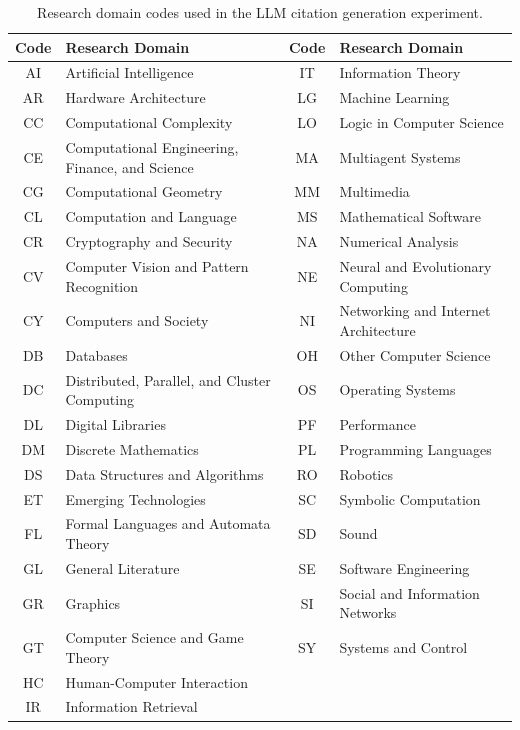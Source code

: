 \begin{table}[t]
  \centering
  \begin{threeparttable}
    \caption{Research domain codes used in the LLM citation generation experiment.}
    \label{tab:domain_codes}
    \small
{}
\begin{tabular}{cl|cl}
\toprule
\textbf{Code} & \textbf{Research Domain} & \textbf{Code} & \textbf{Research Domain} \\
\midrule
AI & Artificial Intelligence & IT & Information Theory \\
AR & Hardware Architecture & LG & Machine Learning \\
CC & Computational Complexity & LO & Logic in Computer Science \\
CE & Computational Engineering, Finance, and Science & MA & Multiagent Systems \\
CG & Computational Geometry & MM & Multimedia \\
CL & Computation and Language & MS & Mathematical Software \\
CR & Cryptography and Security & NA & Numerical Analysis \\
CV & Computer Vision and Pattern Recognition & NE & Neural and Evolutionary Computing \\
CY & Computers and Society & NI & Networking and Internet Architecture \\
DB & Databases & OH & Other Computer Science \\
DC & Distributed, Parallel, and Cluster Computing & OS & Operating Systems \\
DL & Digital Libraries & PF & Performance \\
DM & Discrete Mathematics & PL & Programming Languages \\
DS & Data Structures and Algorithms & RO & Robotics \\
ET & Emerging Technologies & SC & Symbolic Computation \\
FL & Formal Languages and Automata Theory & SD & Sound \\
GL & General Literature & SE & Software Engineering \\
GR & Graphics & SI & Social and Information Networks \\
GT & Computer Science and Game Theory & SY & Systems and Control \\
HC & Human-Computer Interaction & & \\
IR & Information Retrieval & & \\
\bottomrule
\end{tabular}
  \end{threeparttable}
\end{table}

